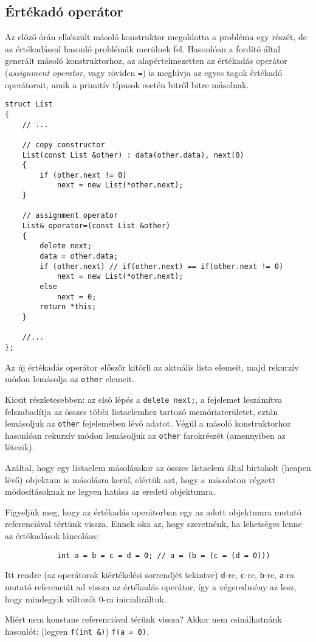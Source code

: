 \documentclass[../cpp_book/cpp_book.tex]{subfiles}
\begin{document}
	\subsection{Értékadó operátor}
  Az előző órán elkészült másoló konstruktor megoldotta a probléma egy részét, de az értékadással hasonló problémák merülnek fel. Hasonlóan a fordító által generált másoló konstruktorhoz, az alapértelmezetten az értékadás operátor (\textit{assignment operator}, vagy röviden \texttt{=}) is meghívja az egyes tagok értékadó operátorait, amik a primitív típusok esetén bitről bitre másolnak.
\begin{lstlisting}
struct List
{
	// ...
	
	// copy constructor
	List(const List &other) : data(other.data), next(0)
	{
		if (other.next != 0)
			next = new List(*other.next);
	}
	
	// assignment operator
	List& operator=(const List &other)
	{
		delete next;
		data = other.data;
		if (other.next) // if(other.next) == if(other.next != 0)
			next = new List(*other.next);
		else
			next = 0;
		return *this;
	}
	
	//...
};
\end{lstlisting}
	Az új értékadás operátor először kitörli az aktuális lista elemeit, majd rekurzív módon lemásolja az \texttt{other} elemeit.
	
  Kicsit részletesebben: az első lépés a \texttt{delete next;}, a fejelemet leszámítva felszabadítja az összes többi listaelemhez tartozó memóriaterületet, eztán lemásoljuk az \texttt{other} fejelemében lévő adatot. Végül a másoló konstruktorhoz hasonlóan rekurzív módon lemásoljuk az \texttt{other} farokrészét (amennyiben az létezik).
	
  Azáltal, hogy egy listaelem másolásakor az összes listaelem által birtokolt (heapen lévő) objektum is másolásra kerül, elértük azt, hogy a másolaton végzett módosításoknak ne legyen hatása az eredeti objektumra.
	\medskip
	
	Figyeljük meg, hogy az értékadás operátorban egy az adott objektumra mutató referenciával tértünk vissza. Ennek oka az, hogy szeretnénk, ha lehetséges lenne az értékadások láncolása:
	\begin{lstlisting}
			int a = b = c = d = 0; // a = (b = (c = (d = 0)))
	\end{lstlisting}
  Itt rendre (az operátorok kiértékelési sorrendjét tekintve) \texttt{d}-re, \texttt{c}-re, \texttt{b}-re, \texttt{a}-ra mutató referenciát ad vissza az értékadás operátor, így a végeredmény az lesz, hogy mindegyik változót 0-ra inicializáltuk.
	\begin{note}
    Miért nem konstans referenciával térünk vissza? Akkor nem csinálhatnánk hasonlót: (legyen \texttt{f(int \&)}) \texttt{f(a = 0)}.
	\end{note}
	
\end{document}
